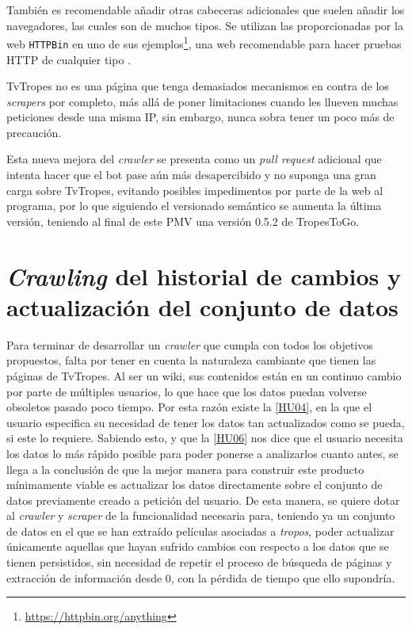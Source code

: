 También es recomendable añadir otras cabeceras adicionales que suelen añadir los
navegadores, las cuales son de muchos tipos. Se utilizan las proporcionadas por
la web \texttt{HTTPBin} en uno de sus
ejemplos\footnote{\url{https://httpbin.org/anything}}, una web recomendable para
hacer pruebas HTTP de cualquier tipo \cite{bettenbuk_10_2019}.

TvTropes no es una página que tenga demasiados mecanismos en contra de los
\textit{scrapers} por completo, más allá de poner limitaciones cuando les
llueven muchas peticiones desde una misma IP, sin embargo, nunca sobra tener un
poco más de precaución.

Esta nueva mejora del \textit{crawler} se presenta como un \textit{pull request}
adicional que intenta hacer que el bot pase aún más desapercibido y no suponga
una gran carga sobre TvTropes, evitando posibles impedimentos por parte de la
web al programa, por lo que siguiendo el versionado semántico se aumenta la
última versión, teniendo al final de este PMV una versión 0.5.2 de TropesToGo.

\section{\textit{Crawling} del historial de cambios y actualización del conjunto de datos}

Para terminar de desarrollar un \textit{crawler} que cumpla con todos los
objetivos propuestos, falta por tener en cuenta la naturaleza cambiante que
tienen las páginas de TvTropes. Al ser un wiki, sus contenidos están en un
continuo cambio por parte de múltiples usuarios, lo que hace que los datos
puedan volverse obsoletos pasado poco tiempo. Por esta razón existe la
\href{https://github.com/jlgallego99/TropesToGo/issues/9}{[HU04]}, en la que el
usuario especifica su necesidad de tener los datos tan actualizados como se
pueda, si este lo requiere. Sabiendo esto, y que la
\href{https://github.com/jlgallego99/TropesToGo/issues/45}{[HU06]} nos dice que
el usuario necesita los datos lo más rápido posible para poder ponerse a
analizarlos cuanto antes, se llega a la conclusión de que la mejor manera para
construir este producto mínimamente viable es actualizar los datos directamente
sobre el conjunto de datos previamente creado a petición del usuario. De esta
manera, se quiere dotar al \textit{crawler} y \textit{scraper} de la
funcionalidad necesaria para, teniendo ya un conjunto de datos en el que se han
extraído películas asociadas a \textit{tropos}, poder actualizar únicamente
aquellas que hayan sufrido cambios con respecto a los datos que se tienen
persistidos, sin necesidad de repetir el proceso de búsqueda de páginas y
extracción de información desde 0, con la pérdida de tiempo que ello supondría.


